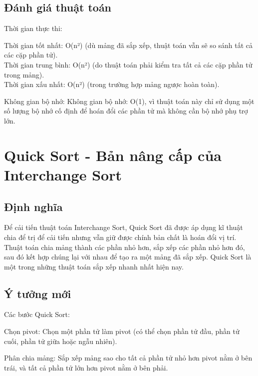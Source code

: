 \documentclass[12pt,a4paper]{report}
\begin{document}
\subsection{ Đánh giá thuật toán}

{Thời gian thực thi:

\hspace{0.5cm} Thời gian tốt nhất: O(n²) (dù mảng đã sắp xếp, thuật toán vẫn sẽ so sánh tất cả các cặp phần tử).\\

\hspace{0.5cm} Thời gian trung bình: O(n²) (do thuật toán phải kiểm tra tất cả các cặp phần tử trong mảng).\\

\hspace{0.5cm} Thời gian xấu nhất: O(n²) (trong trường hợp mảng ngược hoàn toàn).\\}

{Không gian bộ nhớ: Không gian bộ nhớ: O(1), vì thuật toán này chỉ sử dụng một số lượng bộ nhớ cố định để hoán đổi các phần tử mà không cần bộ nhớ phụ trợ lớn.}

\section{ Quick Sort - Bản nâng cấp của Interchange Sort}
 
\subsection{ Định nghĩa}

{\large \hspace{1cm} Để cải tiến thuật toán Interchange Sort, Quick Sort đã được áp dụng
kĩ thuật chia để trị để cải tiến nhưng vẫn giữ được chính bản chất là
hoán đổi vị trí. Thuật toán chia mảng thành các phần nhỏ hơn, sắp xếp các phần nhỏ hơn đó, sau đó kết hợp chúng lại với nhau để tạo ra một mảng đã sắp xếp. Quick Sort là một trong những thuật toán sắp xếp nhanh nhất hiện nay.}

\subsection {Ý tưởng mới}

Các bước Quick Sort:

Chọn pivot: Chọn một phần tử làm pivot (có thể chọn phần tử đầu, phần tử cuối, phần tử giữa hoặc ngẫu nhiên).

Phân chia mảng: Sắp xếp mảng sao cho tất cả phần tử nhỏ hơn pivot nằm ở bên trái, và tất cả phần tử lớn hơn pivot nằm ở bên phải.
\end{document}
